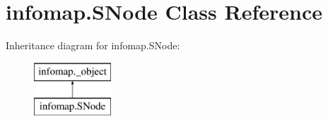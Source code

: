 \hypertarget{classinfomap_1_1SNode}{}\section{infomap.\+S\+Node Class Reference}
\label{classinfomap_1_1SNode}
Inheritance diagram for infomap.\+S\+Node\+:\begin{figure}[H]
\begin{center}
\leavevmode
\includegraphics[height=2.000000cm]{classinfomap_1_1SNode}
\end{center}
\end{figure}
